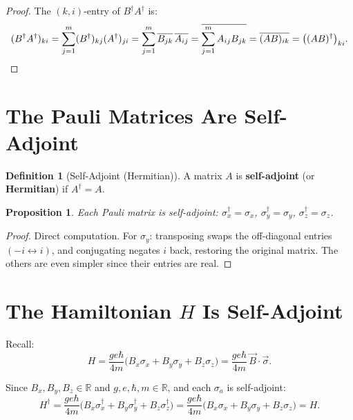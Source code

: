 \documentclass[11pt,a4paper]{article}
\theoremstyle{definition}
\newtheorem{definition}{Definition}[section]
\theoremstyle{plain}
\newtheorem{proposition}{Proposition}[section]
\theoremstyle{remark}
\begin{document}
\begin{proof}
    The $(k,i)$-entry of $B^\dagger A^\dagger$ is:
    \[
        (B^\dagger A^\dagger)_{ki} = \sum_{j=1}^{m}(B^\dagger)_{kj}(A^\dagger)_{ji} = \sum_{j=1}^{m}\overline{B_{jk}}\,\overline{A_{ij}} = \overline{\sum_{j=1}^{m}A_{ij}B_{jk}} = \overline{(AB)_{ik}} = \bigl((AB)^\dagger\bigr)_{ki}. \qedhere
    \]
\end{proof}

\section{The Pauli Matrices Are Self-Adjoint}

\begin{definition}[Self-Adjoint (Hermitian)]
    A matrix $A$ is \textbf{self-adjoint} (or \textbf{Hermitian}) if $A^\dagger = A$.
\end{definition}

\begin{proposition}
    Each Pauli matrix is self-adjoint: $\sigma_x^\dagger = \sigma_x$, $\sigma_y^\dagger = \sigma_y$, $\sigma_z^\dagger = \sigma_z$.
\end{proposition}

\begin{proof}
    Direct computation. For $\sigma_y$: transposing swaps the off-diagonal entries $(-i \leftrightarrow i)$, and conjugating negates $i$ back, restoring the original matrix. The others are even simpler since their entries are real.
\end{proof}

\section{The Hamiltonian $H$ Is Self-Adjoint}

Recall:
\[
    H = \frac{ge\hbar}{4m}\bigl(B_x\sigma_x + B_y\sigma_y + B_z\sigma_z\bigr) = \frac{ge\hbar}{4m}\,\vec{B}\cdot\vec{\sigma}.
\]

Since $B_x, B_y, B_z \in \mathbb{R}$ and $g, e, \hbar, m \in \mathbb{R}$, and each $\sigma_a$ is self-adjoint:
\[
    H^\dagger = \frac{ge\hbar}{4m}\bigl(B_x\sigma_x^\dagger + B_y\sigma_y^\dagger + B_z\sigma_z^\dagger\bigr) = \frac{ge\hbar}{4m}\bigl(B_x\sigma_x + B_y\sigma_y + B_z\sigma_z\bigr) = H.
\]
\end{document}
